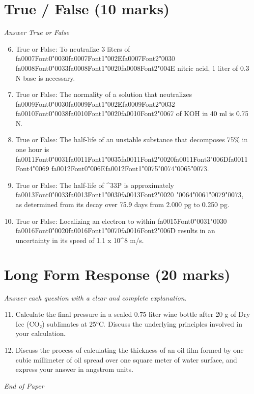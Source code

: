 \documentclass[12pt]{article}
\begin{document}
\section*{True / False (10 marks)}
\textit{Answer True or False}
\begin{enumerate}[label=\arabic*.]
\setcounter{enumi}{5}
\item True or False: To neutralize 3 liters of {\csname fa0007Font0\endcsname\char"0030}{\csname fa0007Font1\endcsname\char"002E}{\csname fa0007Font2\endcsname\char"0030} {\csname fa0008Font0\endcsname\char"0033}{\csname fa0008Font1\endcsname\char"0020}{\csname fa0008Font2\endcsname\char"004E} nitric acid, 1 liter of 0.3 N base is necessary.
\item True or False: The normality of a solution that neutralizes {\csname fa0009Font0\endcsname\char"0030}{\csname fa0009Font1\endcsname\char"002E}{\csname fa0009Font2\endcsname\char"0032} {\csname fa0010Font0\endcsname\char"0038}{\csname fa0010Font1\endcsname\char"0020}{\csname fa0010Font2\endcsname\char"0067} of KOH in 40 ml is 0.75 N.
\item True or False: The half-life of an unstable substance that decomposes 75\% in one hour is {\csname fa0011Font0\endcsname\char"0031}{\csname fa0011Font1\endcsname\char"0035}{\csname fa0011Font2\endcsname\char"0020}{\csname fa0011Font3\endcsname\char"006D}{\csname fa0011Font4\endcsname\char"0069} {\csname fa0012Font0\endcsname\char"006E}{\csname fa0012Font1\endcsname\char"0075}{\char"0074}{\char"0065}{\char"0073}.
\item True or False: The half-life of \^{}33P is approximately {\csname fa0013Font0\endcsname\char"0033}{\csname fa0013Font1\endcsname\char"0030}{\csname fa0013Font2\endcsname\char"0020} {\char"0064}{\char"0061}{\char"0079}{\char"0073}, as determined from its decay over 75.9 days from 2.000 pg to 0.250 pg.
\item True or False: Localizing an electron to within {\csname fa0015Font0\endcsname\char"0031}{\char"0030} {\csname fa0016Font0\endcsname\char"0020}{\csname fa0016Font1\endcsname\char"0070}{\csname fa0016Font2\endcsname\char"006D} results in an uncertainty in its speed of 1.1 x 10\^{}8 m/s.
\end{enumerate}

\section*{Long Form Response (20 marks)}
\textit{Answer each question with a clear and complete explanation.}
\begin{enumerate}[label=\arabic*.]
\setcounter{enumi}{10}
\item Calculate the final pressure in a sealed 0.75 liter wine bottle after 20 g of Dry Ice
(CO₂) sublimates at 25°C. Discuss the underlying principles involved in your calculation.
\item Discuss the process of calculating the thickness of an oil film formed by one cubic
millimeter of oil spread over one square meter of water surface, and express your answer
in angstrom units.
\end{enumerate}

\vfill
\noindent\textit{End of Paper}
\end{document}
